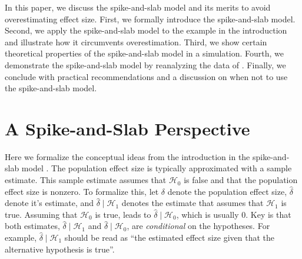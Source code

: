 \documentclass[a4paper]{article}
\newcommand{\hypo}[1]{\ensuremath{\mathcal{H}_{#1}}}
\newcommand{\popDelta}{\delta}
\newcommand{\obsDelta}{\hat{\delta}}
\newenvironment{revision}{\color{teal}}{\color{black}}
\begin{document}
\begin{revision}%
In this paper, we discuss the spike-and-slab model and its merits to avoid overestimating effect size.
First, we formally introduce the spike-and-slab model.
Second, we apply the spike-and-slab model to the example in the introduction and illustrate how it circumvents overestimation.
Third, we show certain theoretical properties of the spike-and-slab model in a simulation.
Fourth, we demonstrate the spike-and-slab model by reanalyzing the data of \textcite{heycke2018two}.
Finally, we conclude with practical recommendations and a discussion on when not to use the spike-and-slab model.
\end{revision}


\section*{A Spike-and-Slab Perspective}
\begin{revision}%
Here we formalize the conceptual ideas from the introduction in the spike-and-slab model \parencite{RouderEtAl2018PBR, clyde1996prediction, mitchell1988bayesian}. 
The population effect size is typically approximated with a sample estimate.
This sample estimate assumes that \hypo{0} is false and that the population effect size is nonzero.
To formalize this, let $\popDelta$ denote the population effect size, $\obsDelta$ denote it's estimate, and $\obsDelta\mid\hypo{1}$ denotes the estimate that assumes that \hypo{1} is true.
Assuming that \hypo{0} is true, leads to $\obsDelta\mid\hypo{0}$, which is usually 0.
Key is that both estimates, $\obsDelta\mid\hypo{1}$ and $\obsDelta\mid\hypo{0}$, are \emph{conditional} on the hypotheses. 
For example, $\obsDelta\mid\hypo{1}$ should be read as ``the estimated effect size given that the alternative hypothesis is true''.


\end{revision}%
\end{document}
